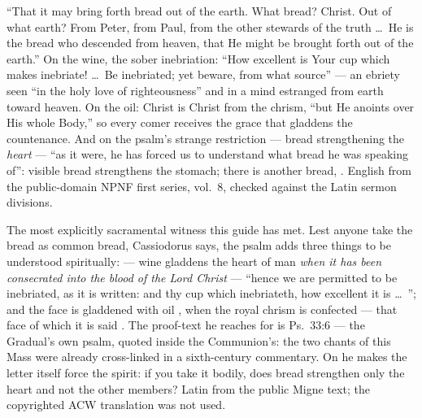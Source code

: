 \begin{witnessnote}
``That it may bring forth bread out of the earth. What bread? Christ. Out of
what earth? From Peter, from Paul, from the other stewards of the truth
\dots\ He is the bread who descended from heaven, that He might be brought
forth out of the earth.'' On the wine, the sober inebriation: ``How
excellent is Your cup which makes inebriate! \dots\ Be inebriated; yet
beware, from what source'' --- an ebriety seen ``in the holy love of
righteousness'' and in a mind estranged from earth toward heaven. On the
oil: Christ is Christ from the chrism, ``but He anoints over His whole
Body,'' so every comer receives the grace that gladdens the countenance.
And on the psalm's strange restriction --- bread strengthening the
\textit{heart} --- ``as it were, he has forced us to understand what bread
he was speaking of'': visible bread strengthens the stomach; there is
another bread, . English from the public-domain NPNF
first series, vol.~8, checked against the Latin sermon divisions.
\end{witnessnote}

\begin{witnessnote}
The most explicitly sacramental witness this guide has met. Lest anyone take
the bread as common bread, Cassiodorus says, the psalm adds three things to
be understood spiritually:  --- wine gladdens the heart of man
\textit{when it has been consecrated into the blood of the Lord Christ} ---
``hence we are permitted to be inebriated, as it is written: and thy cup
which inebriateth, how excellent it is \dots\ ''; and the face is gladdened with oil , when the royal chrism is confected --- that face of
which it is said . The proof-text he
reaches for is Ps.~33:6 --- the Gradual's own psalm, quoted inside the
Communion's: the two chants of this Mass were already cross-linked in a
sixth-century commentary. On  he makes
the letter itself force the spirit: if you take it bodily, does bread
strengthen only the heart and not the other members? Latin from the public
Migne text; the copyrighted ACW translation was not used.
\end{witnessnote}

